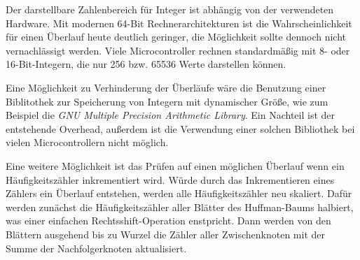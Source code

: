 \documentclass[twoside,11pt,a4paper]{article}
\theoremstyle{break}
\begin{document}
Der darstellbare Zahlenbereich für Integer ist abhängig von der
verwendeten Hardware. Mit modernen 64-Bit Rechnerarchitekturen ist die
Wahrscheinlichkeit für einen Überlauf heute deutlich geringer, die
Möglichkeit sollte dennoch nicht vernachlässigt werden. Viele
Microcontroller rechnen standardmäßig mit 8- oder 16-Bit-Integern, die
nur 256 bzw. 65536 Werte darstellen können.

Eine Möglichkeit zu Verhinderung der Überläufe wäre die Benutzung
einer Biblitothek zur Speicherung von Integern mit dynamischer Größe,
wie zum Beispiel die \emph{GNU Multiple Precision Arithmetic
  Library}. Ein Nachteil ist der entstehende Overhead, außerdem ist
die Verwendung einer solchen Bibliothek bei vielen Microcontrollern
nicht möglich. \cite{GMP}

Eine weitere Möglichkeit ist das Prüfen auf einen möglichen Überlauf
wenn ein Häufigkeitszähler inkrementiert wird. Würde durch das
Inkrementieren eines Zählers ein Überlauf entstehen, werden alle
Häufigkeitszähler neu skaliert. Dafür werden zunächst die
Häufigkeitszähler aller Blätter des Huffman-Baums halbiert, was einer
einfachen Rechtsshift-Operation enstpricht. Dann werden von den
Blättern ausgehend bis zu Wurzel die Zähler aller Zwischenknoten mit
der Summe der Nachfolgerknoten aktualisiert.
\end{document}
